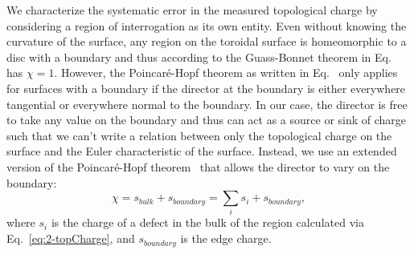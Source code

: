 We characterize the systematic error in the measured topological charge by considering a region of interrogation as its own entity.
Even without knowing the curvature of the surface, any region on the toroidal surface is homeomorphic to a disc with a boundary and thus according to the Guass-Bonnet theorem in Eq.~ has $\chi = 1$.
However, the Poincar\'e-Hopf theorem as written in Eq.~ only applies for surfaces with a boundary if the director at the boundary is either everywhere tangential or everywhere normal to the boundary.
In our case, the director is free to take any value on the boundary and thus can act as a source or sink of charge such that we can't write a relation between only the topological charge on the surface and the Euler characteristic of the surface.
Instead, we use an extended version of the Poincar\'e-Hopf theorem~\cite{RN267} that allows the director to vary on the boundary:
\begin{equation}
  \chi = s_{bulk} + s_{boundary} = \sum\limits_i s_i + s_{boundary},\label{e:3-extendedPH}
\end{equation}
where $s_i$ is the charge of a defect in the bulk of the region calculated via Eq.~\ref{eq:2-topCharge}, and $s_{boundary}$ is the edge charge.


